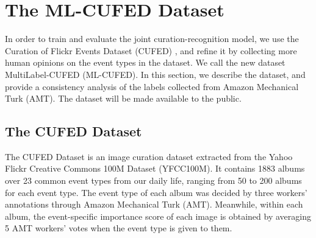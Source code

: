 \documentclass[runningheads]{llncs}
\begin{document}
\section{The ML-CUFED Dataset}
In order to train and evaluate the joint curation-recognition model, we use the Curation of Flickr Events Dataset (CUFED) \cite{CVPR}, and refine it by collecting more human opinions on the event types in the dataset. We call the new dataset MultiLabel-CUFED (ML-CUFED). In this section, we describe the dataset, and provide a consistency analysis of the labels collected from Amazon Mechanical Turk (AMT). The dataset will be made available to the public.
\subsection{The CUFED Dataset}
The CUFED Dataset \cite{CVPR} is an image curation dataset extracted from the Yahoo Flickr Creative Commons 100M Dataset (YFCC100M).  It contains 1883 albums over 23 common event types from our daily life, ranging from 50 to 200 albums for each event type. The event type of each album was decided by three workers' annotations through Amazon Mechanical Turk (AMT). Meanwhile, within each album, the event-specific importance score of each image is obtained by averaging 5 AMT workers' votes when the event type is given to them. 
\end{document}
